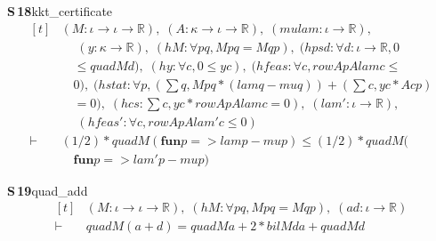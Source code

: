 \documentclass[conference]{IEEEtran}
\theoremstyle{definition}
\newcommand{\lean}[1]{\textsf{\footnotesize #1}}
\begin{document}
\noindent\textbf{S\,18}\quad\lean{kkt\_certificate}
{\footnotesize\[ \begin{aligned}[t]
&(\mathit{M} : \iota \to \iota \to \mathbb{R} ),\; (\mathit{A} : \kappa \to \iota \to \mathbb{R} ),\; (\mathit{mu} \mathit{lam} : \iota \to \mathbb{R} ),\\
&\quad \; (\mathit{y} : \kappa \to \mathbb{R} ),\; (\mathit{hM} : \forall \mathit{p} \mathit{q}, \mathit{M} \mathit{p} \mathit{q} = \mathit{M} \mathit{q} \mathit{p}),\; (\mathit{hpsd} : \forall \mathit{d} : \iota \to \mathbb{R} , 0\\
&\quad \leq \mathit{quad} \mathit{M} \mathit{d}),\; (\mathit{hy} : \forall \mathit{c}, 0 \leq \mathit{y} \mathit{c}),\; (\mathit{hfeas} : \forall \mathit{c}, \mathit{rowAp} \mathit{A} \mathit{lam} \mathit{c} \leq\\
&\quad 0),\; (\mathit{hstat} : \forall \mathit{p}, (\textstyle\sum \mathit{q}, \mathit{M} \mathit{p} \mathit{q} * (\mathit{lam} \mathit{q} - \mathit{mu} \mathit{q})) + (\textstyle\sum \mathit{c}, \mathit{y} \mathit{c} * \mathit{A} \mathit{c} \mathit{p})\\
&\quad = 0),\; (\mathit{hcs} : \textstyle\sum \mathit{c}, \mathit{y} \mathit{c} * \mathit{rowAp} \mathit{A} \mathit{lam} \mathit{c} = 0),\; (\mathit{lam'} : \iota \to \mathbb{R} ),\\
&\quad \; (\mathit{hfeas'} : \forall \mathit{c}, \mathit{rowAp} \mathit{A} \mathit{lam'} \mathit{c} \leq 0)\\
\vdash\;&(1/2) * \mathit{quad} \mathit{M} (\mathbf{fun} \mathit{p} => \mathit{lam} \mathit{p} - \mathit{mu} \mathit{p}) \leq (1/2) * \mathit{quad} \mathit{M} (\\
&\quad \mathbf{fun} \mathit{p} => \mathit{lam'} \mathit{p} - \mathit{mu} \mathit{p})
\end{aligned} \]}

\noindent\textbf{S\,19}\quad\lean{quad\_add}
{\footnotesize\[ \begin{aligned}[t]
&(\mathit{M} : \iota \to \iota \to \mathbb{R} ),\; (\mathit{hM} : \forall \mathit{p} \mathit{q}, \mathit{M} \mathit{p} \mathit{q} = \mathit{M} \mathit{q} \mathit{p}),\; (\mathit{a} \mathit{d} : \iota \to \mathbb{R} )\\
\vdash\;&\mathit{quad} \mathit{M} (\mathit{a} + \mathit{d}) = \mathit{quad} \mathit{M} \mathit{a} + 2 * \mathit{bil} \mathit{M} \mathit{d} \mathit{a} + \mathit{quad} \mathit{M} \mathit{d}
\end{aligned} \]}
\end{document}

